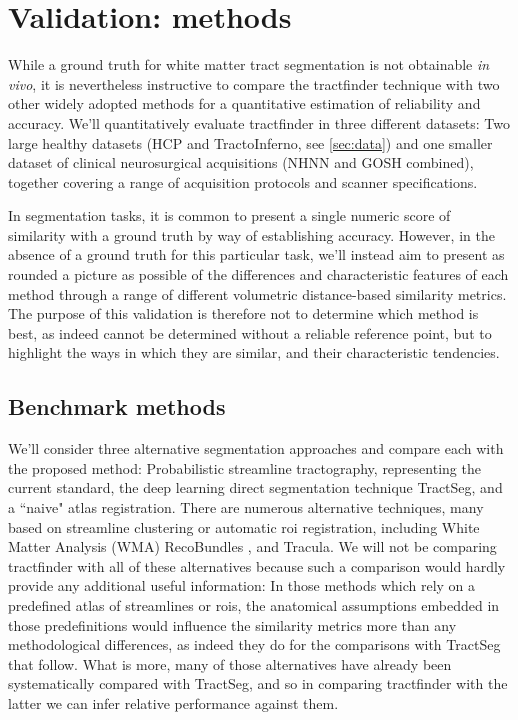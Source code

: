 
\section{Validation: methods}

While a ground truth for white matter tract segmentation is not obtainable \textit{in vivo}, it is nevertheless instructive to compare the tractfinder technique with two other widely adopted methods for a quantitative estimation of reliability and accuracy.
We'll quantitatively evaluate tractfinder in three different datasets: Two large healthy datasets (HCP and TractoInferno, see \ref{sec:data}) and one smaller dataset of clinical neurosurgical acquisitions (NHNN and GOSH combined), together covering a range of acquisition protocols and scanner specifications.

In segmentation tasks, it is common to present a single numeric score of similarity with a ground truth by way of establishing accuracy.
However, in the absence of a ground truth for this particular task, we'll instead aim to present as rounded a picture as possible of the differences and characteristic features of each method through a range of different volumetric distance-based similarity metrics.
The purpose of this validation is therefore not to determine which method is best, as indeed cannot be determined without a reliable reference point, but to highlight the ways in which they are similar, and their characteristic tendencies.

\subsection{Benchmark methods}

We'll consider three alternative segmentation approaches and compare each with the proposed method: Probabilistic streamline tractography, representing the current standard, the deep learning direct segmentation technique TractSeg, and a ``naive" atlas registration.
There are numerous alternative techniques, many based on streamline clustering or automatic \gls{roi} registration, including White Matter Analysis (WMA)\autocite{ODonnell2017} RecoBundles \autocite{Garyfallidis2018}, and Tracula.\autocite{Yendiki2011}
We will not be comparing tractfinder with all of these alternatives because such a comparison would hardly provide any additional useful information:
In those methods which rely on a predefined atlas of streamlines or \glspl{roi}, the anatomical assumptions embedded in those predefinitions would influence the similarity metrics more than any methodological differences, as indeed they do for the comparisons with TractSeg that follow.
What is more, many of those alternatives have already been systematically compared with TractSeg\autocite{Wasserthal2018}, and so in comparing tractfinder with the latter we can infer relative performance against them.

